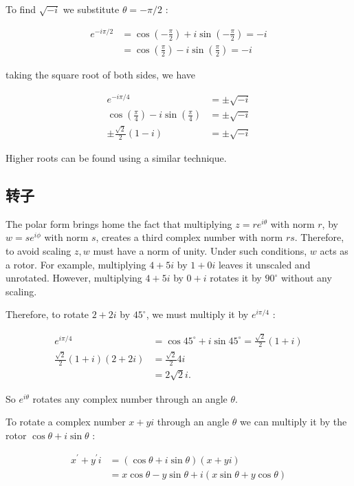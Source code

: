 To find $\sqrt{-i}$ we substitute $\theta=-\pi / 2$ :

$$
\begin{aligned}
e^{-i \pi / 2} & =\cos \left(-\frac{\pi}{2}\right)+i \sin \left(-\frac{\pi}{2}\right)=-i \\
& =\cos \left(\frac{\pi}{2}\right)-i \sin \left(\frac{\pi}{2}\right)=-i
\end{aligned}
$$

taking the square root of both sides, we have

$$
\begin{aligned}
e^{-i \pi / 4} & =\pm \sqrt{-i} \\
\cos \left(\frac{\pi}{4}\right)-i \sin \left(\frac{\pi}{4}\right) & =\pm \sqrt{-i} \\
\pm \frac{\sqrt{2}}{2}(1-i) & =\pm \sqrt{-i}
\end{aligned}
$$

Higher roots can be found using a similar technique.

\subsection{转子}
The polar form brings home the fact that multiplying $z=r e^{i \theta}$ with norm $r$, by $w=s e^{i \phi}$ with norm $s$, creates a third complex number with norm $r s$. Therefore, to avoid scaling $z, w$ must have a norm of unity. Under such conditions, $w$ acts as a rotor. For example, multiplying $4+5 i$ by $1+0 i$ leaves it unscaled and unrotated. However, multiplying $4+5 i$ by $0+i$ rotates it by $90^{\circ}$ without any scaling.

Therefore, to rotate $2+2 i$ by $45^{\circ}$, we must multiply it by $e^{i \pi / 4}$ :

$$
\begin{aligned}
e^{i \pi / 4} & =\cos 45^{\circ}+i \sin 45^{\circ}=\frac{\sqrt{2}}{2}(1+i) \\
\frac{\sqrt{2}}{2}(1+i)(2+2 i) & =\frac{\sqrt{2}}{2} 4 i \\
& =2 \sqrt{2} i .
\end{aligned}
$$

So $e^{i \theta}$ rotates any complex number through an angle $\theta$.

To rotate a complex number $x+y i$ through an angle $\theta$ we can multiply it by the rotor $\cos \theta+i \sin \theta$ :

$$
\begin{aligned}
x^{\prime}+y^{\prime} i & =(\cos \theta+i \sin \theta)(x+y i) \\
& =x \cos \theta-y \sin \theta+i(x \sin \theta+y \cos \theta)
\end{aligned}
$$

